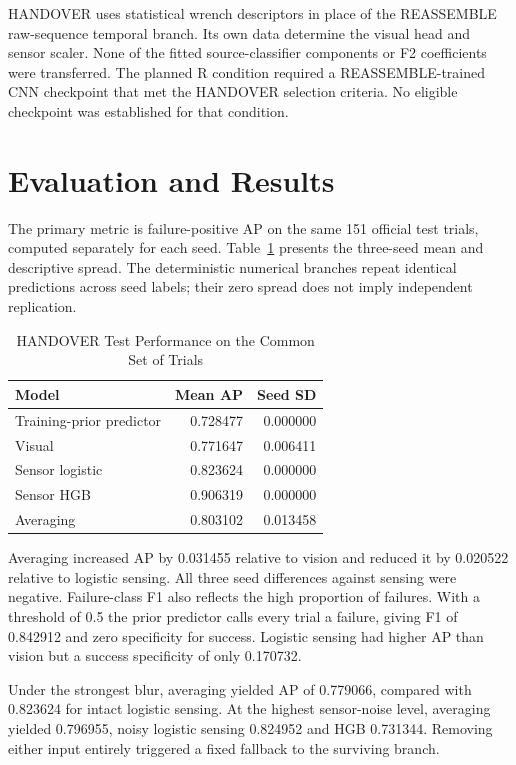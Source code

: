 HANDOVER uses statistical wrench descriptors in place of the REASSEMBLE raw-sequence temporal branch. Its own data determine the visual head and sensor scaler. None of the fitted source-classifier components or F2 coefficients were transferred. The planned R condition required a REASSEMBLE-trained CNN checkpoint that met the HANDOVER selection criteria. No eligible checkpoint was established for that condition.

\section{Evaluation and Results}
The primary metric is failure-positive AP on the same 151 official test trials, computed separately for each seed. Table~\ref{tab:handover-clean} presents the three-seed mean and descriptive spread. The deterministic numerical branches repeat identical predictions across seed labels; their zero spread does not imply independent replication.

\begin{table}[htbp]
\caption{HANDOVER Test Performance on the Common Set of Trials}\label{tab:handover-clean}
\centering\small

\begin{tabular}{lrr}\hline Model&Mean AP&Seed SD\\\hline
Training-prior predictor&0.728477&0.000000\\
Visual&0.771647&0.006411\\
Sensor logistic&0.823624&0.000000\\
Sensor HGB&0.906319&0.000000\\
Averaging&0.803102&0.013458\\\hline
\end{tabular}
\end{table}

Averaging increased AP by 0.031455 relative to vision and reduced it by 0.020522 relative to logistic sensing. All three seed differences against sensing were negative. Failure-class F1 also reflects the high proportion of failures. With a threshold of 0.5 the prior predictor calls every trial a failure, giving F1 of 0.842912 and zero specificity for success. Logistic sensing had higher AP than vision but a success specificity of only 0.170732.

Under the strongest blur, averaging yielded AP of 0.779066, compared with 0.823624 for intact logistic sensing. At the highest sensor-noise level, averaging yielded 0.796955, noisy logistic sensing 0.824952 and HGB 0.731344. Removing either input entirely triggered a fixed fallback to the surviving branch.

